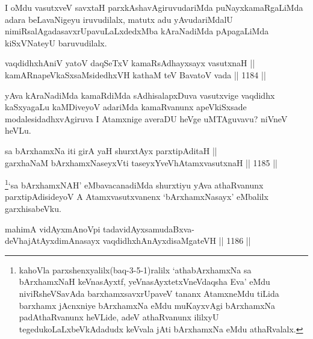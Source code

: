 \begin{artha}
I oMdu vasutxveV savxtaH parxkAshavAgiruvudariMda puNayxkamaRgaLiMda adara beLavaNigeyu iruvudilalx, matutx adu yAvudariMdalU nimiRsalAgadasavxrUpavuLaLxdedxMba kAraNadiMda pApagaLiMda kiSxVNateyU baruvudilalx.
\end{artha}


\begin{shl}
vaqdidhxhAniV yatoV daqSeTxV kamaRsAdhayxsayx vasutxnaH || \\
kamARnapeVkaSxsaMsidedhxVH kathaM teV BavatoV vada \hfill || 1184 ||  
\end{shl}

\begin{artha}
yAva kAraNadiMda kamaRdiMda sAdhisalapxDuva vasutxvige vaqdidhx kaSxyagaLu kaMDiveyoV adariMda kamaRvanunx apeVkiSxsade modalesidadhxvAgiruva I Atamxnige averaDU heVge uMTAguvavu? niVneV heVLu.
\end{artha}


\begin{shl}
sa bArxhamxNa iti girA yaH shurxtAyx parxtipAditaH || \\
garxhaNaM bArxhamxNaseyxVti taseyxYveVhA\s \s tamxvasutxnaH \hfill || 1185 ||  
\end{shl}

\begin{artha}
\footnote{kahoVla parxshenxyalilx(baq-3-5-1)ralilx `athabArxhamxNa sa bArxhamxNaH keVnasAyxtf, yeVnasAyxtetxVneVdaqsha Eva' eMdu niviRsheVSavAda barxhamxsavxrUpaveV tananx AtamxneMdu tiLida barxhamx jAcnxniye bArxhamxNa eMdu muKayxvAgi bArxhamxNa padAthaRvanunx heVLide, adeV athaRvanunx ililxyU tegedukoLaLxbeVkAdadudx keVvala jAti bArxhamxNa eMdu athaRvalalx.}`sa bArxhamxNAH' eMbavacanadiMda shurxtiyu yAva athaRvanunx parxtipAdisideyoV A Atamxvasutxvanenx `bArxhamxNasayx' eMbalilx garxhisabeVku.
\end{artha}



\begin{shl}
mahimA vidAyxmAnoV\s pi tadavidAyxsamudaBxva- \\
deVhajAtAyxdimAnasayx vaqdidhxhAnAyxdisaMgateVH \hfill || 1186 ||  
\end{shl}
				
